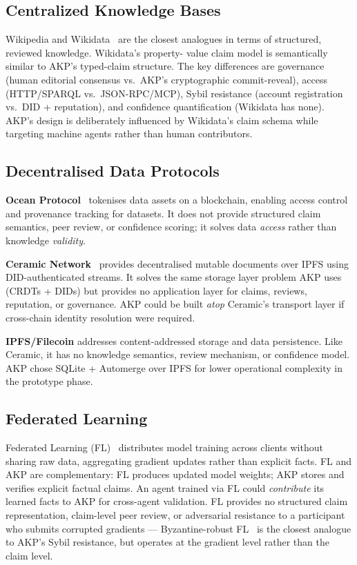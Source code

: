 \documentclass[10pt,twocolumn]{article}
\begin{document}
\subsection{Centralized Knowledge Bases}

Wikipedia and Wikidata~\cite{vrandecic2014wikidata} are the closest
analogues in terms of structured, reviewed knowledge. Wikidata's property-
value claim model is semantically similar to AKP's typed-claim structure.
The key differences are governance (human editorial consensus vs.\ AKP's
cryptographic commit-reveal), access (HTTP/SPARQL vs.\ JSON-RPC/MCP),
Sybil resistance (account registration vs.\ DID + reputation), and
confidence quantification (Wikidata has none). AKP's design is deliberately
influenced by Wikidata's claim schema while targeting machine agents rather
than human contributors.

\subsection{Decentralised Data Protocols}

\textbf{Ocean Protocol}~\cite{ocean2019} tokenises data assets on a blockchain,
enabling access control and provenance tracking for datasets. It does not
provide structured claim semantics, peer review, or confidence scoring; it
solves data \emph{access} rather than knowledge \emph{validity}.

\textbf{Ceramic Network}~\cite{ceramic2021} provides decentralised mutable
documents over IPFS using DID-authenticated streams. It solves the same
storage layer problem AKP uses (CRDTs + DIDs) but provides no application
layer for claims, reviews, reputation, or governance. AKP could be built
\emph{atop} Ceramic's transport layer if cross-chain identity resolution
were required.

\textbf{IPFS/Filecoin} addresses content-addressed storage and data
persistence. Like Ceramic, it has no knowledge semantics, review mechanism,
or confidence model. AKP chose SQLite + Automerge over IPFS for lower
operational complexity in the prototype phase.

\subsection{Federated Learning}

Federated Learning (FL)~\cite{mcmahan2017fedavg} distributes model training
across clients without sharing raw data, aggregating gradient updates rather
than explicit facts. FL and AKP are complementary: FL produces updated model
weights; AKP stores and verifies explicit factual claims. An agent trained via
FL could \emph{contribute} its learned facts to AKP for cross-agent
validation. FL provides no structured claim representation, claim-level peer
review, or adversarial resistance to a participant who submits corrupted
gradients — Byzantine-robust FL~\cite{blanchard2017byzantine} is the closest
analogue to AKP's Sybil resistance, but operates at the gradient level rather
than the claim level.
\end{document}
